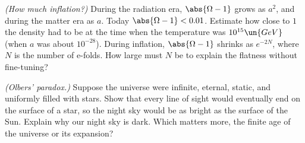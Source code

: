 \begin{problems}
 \emph{(How much inflation?)} During the radiation era, $\abs{\Omega - 1}$ grows as $a^2$, and during the matter era as $a$. Today $\abs{\Omega-1}<0.01$. Estimate how close to $1$ the density had to be at the time when the temperature was $10^{15}\un{GeV}$ (when $a$ was about $10^{-28}$). During inflation, $\abs{\Omega - 1}$ shrinks as $e^{-2N}$, where $N$ is the number of e-folds. How large must $N$ be to explain the flatness without fine-tuning?

\core \emph{(Olbers' paradox.)} Suppose the universe were infinite, eternal, static, and uniformly filled with stars. Show that every line of sight would eventually end on the surface of a star, so the night sky would be as bright as the surface of the Sun. Explain why our night sky is dark. Which matters more, the finite age of the universe or its expansion?
\end{problems}

\begin{reading}
\end{reading}
